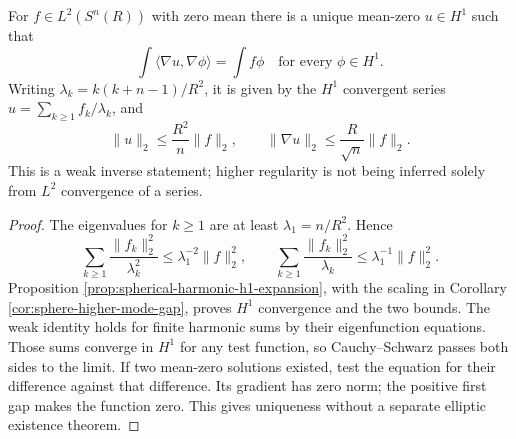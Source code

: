 \begin{proposition}\label{prop:sphere-poisson-inverse}
For $f\in L^2(S^n(R))$ with zero mean there is a unique mean-zero $u\in H^1$ such that
\[
 \int\langle\nabla u,\nabla\phi\rangle=\int f\phi
 \quad\text{for every }\phi\in H^1.
\]
Writing $\lambda_k=k(k+n-1)/R^2$, it is given by the $H^1$ convergent series $u=\sum_{k\geq1}f_k/\lambda_k$, and
\[
 \|u\|_2\leq\frac{R^2}{n}\|f\|_2,\qquad
 \|\nabla u\|_2\leq\frac R{\sqrt n}\|f\|_2.
\]
This is a weak inverse statement; higher regularity is not being inferred solely from $L^2$ convergence of a series.
\end{proposition}
\begin{proof}
The eigenvalues for $k\geq1$ are at least $\lambda_1=n/R^2$. Hence
\[
 \sum_{k\geq1}\frac{\|f_k\|_2^2}{\lambda_k^2}
 \leq\lambda_1^{-2}\|f\|_2^2,\qquad
 \sum_{k\geq1}\frac{\|f_k\|_2^2}{\lambda_k}
 \leq\lambda_1^{-1}\|f\|_2^2.
\]
Proposition \ref{prop:spherical-harmonic-h1-expansion}, with the scaling in Corollary \ref{cor:sphere-higher-mode-gap}, proves $H^1$ convergence and the two bounds. The weak identity holds for finite harmonic sums by their eigenfunction equations. Those sums converge in $H^1$ for any test function, so Cauchy--Schwarz passes both sides to the limit. If two mean-zero solutions existed, test the equation for their difference against that difference. Its gradient has zero norm; the positive first gap makes the function zero. This gives uniqueness without a separate elliptic existence theorem.
\end{proof}
